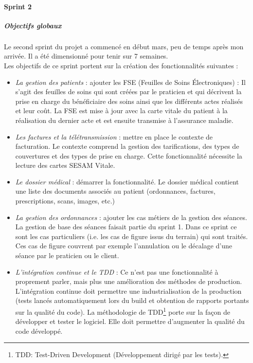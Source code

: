 \paragraph*{Sprint 2}
\subparagraph{Objectifs globaux}
Le second sprint du projet a commencé en début mars, peu de temps après mon arrivée. Il a été dimensionné pour tenir sur 7 semaines.\\
Les objectifs de ce sprint portent sur la création des fonctionnalités suivantes : 
\begin{itemize}
	\item \textit{La gestion des patients} : ajouter les \gls{FSE} (Feuilles de Soins Électroniques) : Il s'agit des feuilles de soins qui sont créées par le praticien et qui décrivent la prise en charge du bénéficiaire des soins ainsi que les différents actes réalisés et leur coût. La \gls{FSE} est mise à jour avec la carte vitale du patient à la réalisation du dernier acte et est ensuite transmise à l'assurance maladie.
	
	\item \textit{Les factures et la télétransmission} : mettre en place le contexte de facturation. Le contexte comprend la gestion des tarifications, des types de couvertures et des types de prise en charge. Cette fonctionnalité nécessite la lecture des cartes SESAM Vitale.

	\item \textit{Le dossier médical} : démarrer la fonctionnalité. Le dossier médical contient une liste des documents associés au patient (ordonnances, factures, prescriptions, scans, images, etc.)
	
	\item \textit{La gestion des ordonnances} : ajouter les cas métiers de la gestion des séances. La gestion de base des séances faisait partie du sprint 1. Dans ce sprint ce sont les cas particuliers (i.e. les cas de figure issus du terrain) qui sont traités. Ces cas de figure couvrent par exemple l'annulation ou le décalage d'une séance par le praticien ou le client.

	\item \textit{L'intégration continue et le TDD} : Ce n'est pas une fonctionnalité à proprement parler, mais plus une amélioration des méthodes de production. L'intégration continue doit permettre une industrialisation de la production (tests lancés automatiquement lors du build et obtention de rapports portants sur la qualité du code). La méthodologie de TDD\footnote{TDD: Test-Driven Development (Développement dirigé par les tests).} porte sur la façon de développer et tester le logiciel. Elle doit permettre d'augmenter la qualité du code développé.
\end{itemize}

